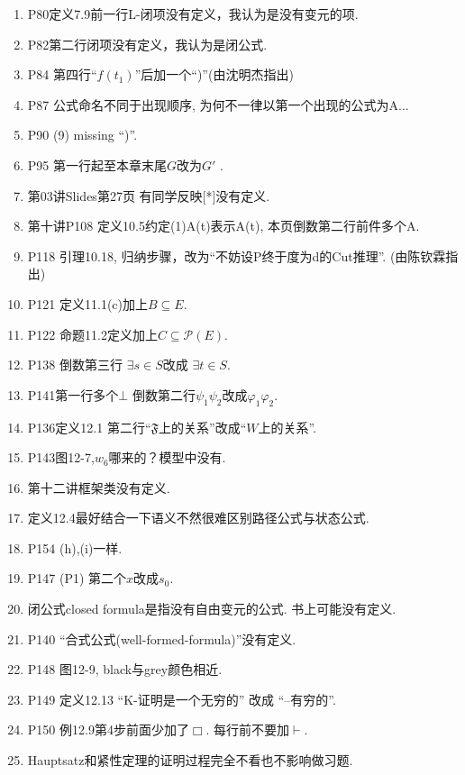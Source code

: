 \documentclass{article}
\begin{document}
\begin{enumerate}
\item P80定义7.9前一行L-闭项没有定义，我认为是没有变元的项. 
\item P82第二行闭项没有定义，我认为是闭公式. 
\item P84 第四行``$f(t_1)$''后加一个``)''(由沈明杰指出)
\item P87 公式命名不同于出现顺序, 为何不一律以第一个出现的公式为A...
\item P90 (9) missing ``)''. 
\item P95 第一行起至本章末尾$G$改为$G'$ . 
\item 第03讲Slides第27页 有同学反映[*]没有定义. 
\item 第十讲P108 定义10.5约定(1)A(t)表示A(t), 本页倒数第二行前件多个A. 
\item P118 引理10.18, 归纳步骤，改为``不妨设P终于度为d的Cut推理''. (由陈钦霖指出)
\item P121 定义11.1(c)加上$B\subseteq E$. 
\item P122 命题11.2定义加上$C\subseteq \mathcal{P}(E)$. 
\item P138 倒数第三行 $\exists s \in S$改成 $\exists t \in S$. 
\item P141第一行多个$\bot$ 倒数第二行$\psi_1 \psi_2$改成$\varphi_1 \varphi_2$. 
\item P136定义12.1 第二行``$\mathfrak{F}$上的关系''改成``$W$上的关系''. 
\item P143图12-7,$w_6$哪来的？模型中没有. 
\item 第十二讲框架类没有定义. 


\item 定义12.4最好结合一下语义不然很难区别路径公式与状态公式. 
\item P154 (h),(i)一样. 
\item P147 (P1) 第二个$x$改成$s_0$. 
\item 闭公式closed formula是指没有自由变元的公式. 书上可能没有定义. 
\item P140 ``合式公式(well-formed-formula)''没有定义. 
\item P148 图12-9, black与grey颜色相近. 
\item P149 定义12.13 ``K-证明是一个无穷的'' 改成 ``--有穷的''. 
\item P150 例12.9第4步前面少加了$\Box$. 每行前不要加$\vdash$. 

\item Hauptsatz和紧性定理的证明过程完全不看也不影响做习题. 


\end{enumerate}
\end{document}
